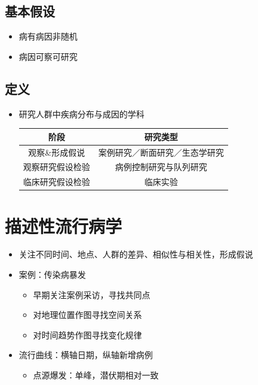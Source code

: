 \documentclass[]{book}
\providecommand{\tightlist}{%
  \setlength{\itemsep}{0pt}\setlength{\parskip}{0pt}}
\begin{document}
\hypertarget{ux57faux672cux5047ux8bbe}{%
\subsection{基本假设}\label{ux57faux672cux5047ux8bbe}}

\begin{itemize}
\tightlist
\item
  病有病因非随机
\item
  病因可察可研究
\end{itemize}

\hypertarget{ux5b9aux4e49}{%
\subsection{定义}\label{ux5b9aux4e49}}

\begin{itemize}
\item
  研究人群中疾病分布与成因的学科

  \begin{longtable}[]{@{}cc@{}}
  \toprule
  阶段 & 研究类型\tabularnewline
  \midrule
  \endhead
  观察\&形成假说 & 案例研究／断面研究／生态学研究\tabularnewline
  观察研究假设检验 & 病例控制研究与队列研究\tabularnewline
  临床研究假设检验 & 临床实验\tabularnewline
  \bottomrule
  \end{longtable}
\end{itemize}

\hypertarget{ux63cfux8ff0ux6027ux6d41ux884cux75c5ux5b66}{%
\section{描述性流行病学}\label{ux63cfux8ff0ux6027ux6d41ux884cux75c5ux5b66}}

\begin{itemize}
\tightlist
\item
  关注不同时间、地点、人群的差异、相似性与相关性，形成假说
\item
  案例：传染病暴发

  \begin{itemize}
  \tightlist
  \item
    早期关注案例采访，寻找共同点
  \item
    对地理位置作图寻找空间关系
  \item
    对时间趋势作图寻找变化规律
  \end{itemize}
\item
  流行曲线：横轴日期，纵轴新增病例

  \begin{itemize}
  \tightlist
  \item
    点源爆发：单峰，潜伏期相对一致
  \end{itemize}
\end{itemize}
\end{document}
